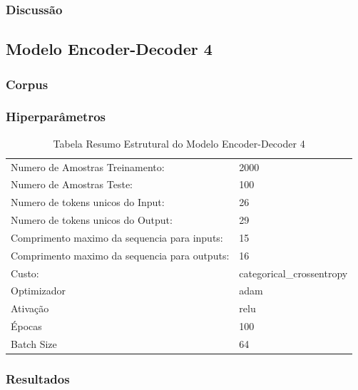 \subsubsection{Discussão}

\subsection{Modelo Encoder-Decoder 4}
\subsubsection{Corpus}
\subsubsection{Hiperparâmetros} 

\begin{table}[h]
\centering
\begin{tabular}{ll}
Numero de Amostras Treinamento: & 2000 \\
Numero de Amostras Teste: & 100 \\
Numero de tokens unicos do Input: & 26 \\
Numero de tokens unicos do Output: & 29 \\
Comprimento maximo da sequencia para inputs: & 15 \\
Comprimento maximo da sequencia para outputs: & 16 \\
Custo: & categorical\_crossentropy \\
Optimizador & adam \\
Ativação & relu \\
Épocas & 100 \\
Batch Size & 64
\end{tabular}
\caption{Tabela Resumo Estrutural do Modelo Encoder-Decoder 4}
\label{tab:res4}
\end{table}

\subsubsection{Resultados}

